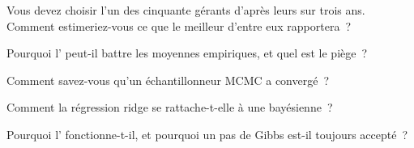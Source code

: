 \begin{interviewq}\label{iq:qm:bayesian-methods:2}
Vous devez choisir l'un des cinquante gérants d'après leurs  sur trois ans. Comment estimeriez-vous ce que le meilleur d'entre eux rapportera~?
\end{interviewq}

\begin{interviewq}\label{iq:qm:bayesian-methods:3}
Pourquoi l' peut-il battre les moyennes empiriques, et quel est le piège~?
\end{interviewq}

\begin{interviewq}\label{iq:qm:bayesian-methods:4}
Comment savez-vous qu'un échantillonneur MCMC a convergé~?
\end{interviewq}

\begin{interviewq}\label{iq:qm:bayesian-methods:5}
Comment la régression ridge se rattache-t-elle à une  bayésienne~?
\end{interviewq}

\begin{interviewq}\label{iq:qm:bayesian-methods:6}
Pourquoi l' fonctionne-t-il, et pourquoi un pas de Gibbs est-il toujours accepté~?
\end{interviewq}
